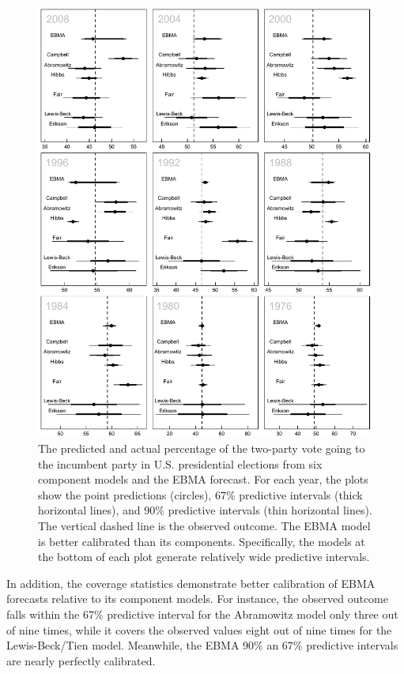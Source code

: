 \documentclass[12pt,fullpage]{article}
\begin{document}
 \begin{figure}[ht!]
   \caption{\footnotesize The predicted and actual percentage of the
     two-party vote going to the incumbent party in U.S. presidential
     elections from six component models and the EBMA forecast.  For
     each year, the plots show the point predictions (circles), 67\%
     predictive intervals (thick horizontal lines), and 90\%
     predictive intervals (thin horizontal lines).  The vertical
     dashed line is the observed outcome.  The EBMA model is
   better calibrated than its components.  Specifically, the
   models at the bottom of each plot generate relatively wide
   predictive intervals.}
 \label{PresPlots2}
 \begin{center}
 \includegraphics[width=5.6 in]{PresPlot2.PDF}
 \end{center}
 \end{figure}


 In addition, the coverage statistics demonstrate better calibration
 of EBMA forecasts relative to its component models.  For instance,
 the observed outcome falls within the 67\% predictive interval for
 the Abramowitz model only three out of nine times, while it covers the
 observed values eight out of nine times for the Lewis-Beck/Tien
 model.  Meanwhile, the EBMA 90\% an 67\% predictive intervals are
 nearly perfectly calibrated.
\end{document}
